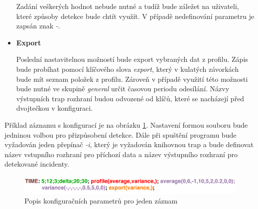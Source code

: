 \begin{itemize}
  Zadání veškerých hodnot nebude nutné a tudíž bude záležet na uživateli, které způsoby detekce 
  bude chtít využít. V případě nedefinování parametru je zapsán znak \textit{-}.
  
  \item \textbf{Export}
  
  Poslední nastavitelnou možností bude export vybraných dat z profilu. Zápis bude probíhat pomocí 
  klíčového slova \textit{export}, který v kulatých závorkách bude mít seznam položek z profilu. Zároveň 
  v případě využití této možnosti bude nutné ve skupině \textit{general} určit časovou periodu
  odesílání.
  Názvy výstupních trap rozhraní
  budou odvozené od klíčů, které se nacházejí před dvojtečkou v konfiguraci.
  
 \end{itemize}

 Příklad záznamu s konfigurací je na obrázku \ref{obr.config}. Nastavení formou
 souboru bude jedninou volbou pro přizpůsobení detekce. Dále při 
 spuštění programu bude vyžadován jeden přepínač \textit{-i}, který je vyžadován knihovnou trap a 
 bude definovat název vstupního
 rozhraní pro příchozí data a název výstupního rozhraní pro detekované incidenty. 
 
   \begin{figure}[ht]
   \begin{center}
   \includegraphics[scale=0.5]{pictures/config-file}
   \caption{Popis konfiguračních parametrů pro jeden záznam}
   \label{obr.config}
   \end{center}
   \end{figure}
 
